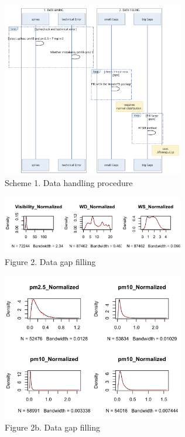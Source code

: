 \documentclass[
  11pt,
]{article}
\begin{document}
\newpage

\begin{figure}
\centering
\includegraphics[width=3.125in,height=\textheight,keepaspectratio]{images/scheme_1.png}
\caption{Scheme 1. Data handling procedure}
\end{figure}

\newpage

\begin{figure}
\centering
\includegraphics[width=3.125in,height=\textheight,keepaspectratio]{images/figure_2b.png}
\caption{Figure 2. Data gap filling}
\end{figure}

\begin{figure}
\centering
\includegraphics[width=3.125in,height=\textheight,keepaspectratio]{images/figure_2c.png}
\caption{Figure 2b. Data gap filling}
\end{figure}
\end{document}
